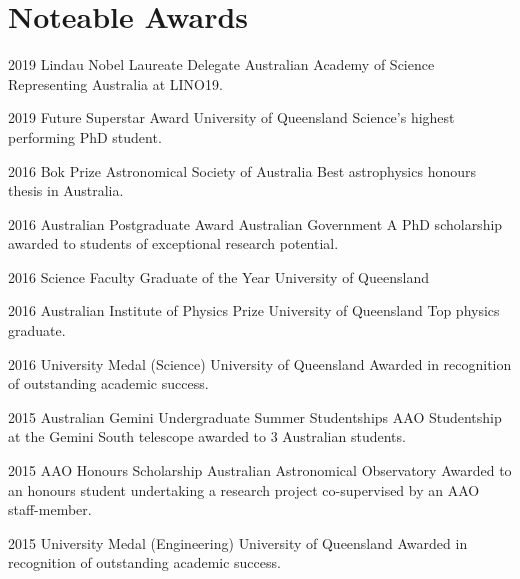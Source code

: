 \section{Noteable Awards}
\begin{entrylist}
	\entryInline
	{2019} %
	{Lindau Nobel Laureate Delegate}
	{Australian Academy of Science}
	{Representing Australia at LINO19.}
\end{entrylist}
\begin{entrylist}
	\entryInline
	{2019} %
	{Future Superstar Award}
	{University of Queensland}
	{Science's highest performing PhD student.}
\end{entrylist}
\begin{entrylist}
	\entryInline
	{2016} %
	{Bok Prize}
	{Astronomical Society of Australia}
	{Best astrophysics honours thesis in Australia.}
\end{entrylist}
\begin{entrylist}
	\entryInlineSmall
	{2016} %
	{Australian Postgraduate Award}
	{Australian Government}
	{A PhD scholarship awarded to students of exceptional research potential.}
\end{entrylist}
\begin{entrylist}
	\entryInlineSmall
	{2016} %
	{Science Faculty Graduate of the Year}
	{University of Queensland}
	{}
\end{entrylist}
\begin{entrylist}
	\entryInline
	{2016} %
	{Australian Institute of Physics Prize}
	{University of Queensland}
	{Top physics graduate.}
\end{entrylist}
\begin{entrylist}
	\entryInlineSmall
	{2016} %
	{University Medal (Science)}
	{University of Queensland}
	{Awarded in recognition of outstanding academic success.}
\end{entrylist}
\begin{entrylist}
	\entryInlineSmall
	{2015} %
	{Australian Gemini Undergraduate Summer Studentships}
	{AAO}
	{Studentship at the Gemini South telescope awarded to 3 Australian students.}
\end{entrylist}
\begin{entrylist}
	\entryInlineSmall
	{2015} %
	{AAO Honours Scholarship}
	{Australian Astronomical Observatory}
	{Awarded to an honours student undertaking a research project co-supervised by an AAO staff-member.}
\end{entrylist}
\begin{entrylist}
	\entryInlineSmall
	{2015} %
	{University Medal (Engineering)}
	{University of Queensland}
	{Awarded in recognition of outstanding academic success.}
\end{entrylist}


